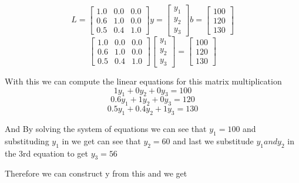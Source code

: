 \documentclass{article}
\begin{document}
\begin{enumerate}
    \[
      L = 
      \begin{bmatrix}
        1.0 & 0.0 & 0.0 \\
        0.6 & 1.0 & 0.0 \\
        0.5 & 0.4 & 1.0 
      \end{bmatrix}
      y = 
      \begin{bmatrix}
        y_1 \\
        y_2 \\
        y_3
      \end{bmatrix}
      b = 
      \begin{bmatrix}
        100 \\
        120 \\
        130 
      \end{bmatrix}
    \]
    \[
      \begin{bmatrix}
        1.0 & 0.0 & 0.0 \\
        0.6 & 1.0 & 0.0 \\
        0.5 & 0.4 & 1.0 
      \end{bmatrix}
      \begin{bmatrix}
        y_1 \\
        y_2 \\
        y_3
      \end{bmatrix}
      =
      \begin{bmatrix}
        100 \\
        120 \\
        130 
      \end{bmatrix}
    \]
    \par
    With this we can compute the linear equations for this matrix multiplication
    \begin{equation}
      1y_1+0y_2+0y_3 = 100
    \end{equation}
    \begin{equation}
      0.6y_1+1y_2+0y_3 = 120
    \end{equation}
    \begin{equation}
      0.5y_1+0.4y_2+1y_3 = 130
    \end{equation}
    \par
    And By solving the system of equations we can see that $y_1 = 100$ and substituding $y_1$ in we get can see that $y_2 = 60$ and last we substitude $y_1 and y_2$ in the 3rd equation to get $y_3 = 56$
    \par
    Therefore we can construct y from this and we get
    \begin{center}

\end{center}
\end{enumerate}
\end{document}

